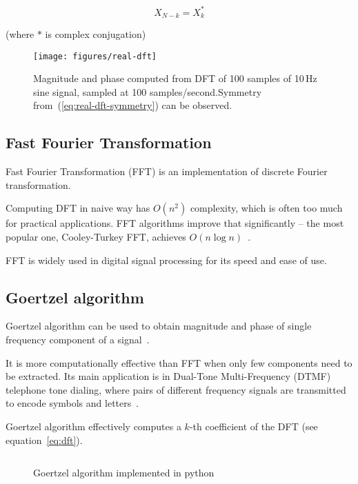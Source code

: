 \begin{equation}
\label{eq:real-dft-symmetry}
X_{N-k} = X_{k}^{*}
\end{equation}

(where $*$ is complex conjugation)

\begin{figure}[h]
  \centering
  \texttt{[image: figures/real-dft]}
  \caption[Magnitude and phase computed from DFT]{Magnitude and phase computed from DFT of 100 samples of 10\,Hz sine signal, sampled at 100 samples/second.\newline Symmetry from~(\ref{eq:real-dft-symmetry}) can be observed.}
  \label{fig:real-dft}
\end{figure}

\subsection{Fast Fourier Transformation}
\label{subsec:fft}

Fast Fourier Transformation (FFT) is an implementation of discrete Fourier transformation.

Computing DFT in naive way has $O(n^{2})$ complexity, which is often too much for practical applications.
FFT algorithms improve that significantly -- the most popular one, Cooley-Turkey FFT, achieves $O(n\log{n})$~\cite{JOSDFT}.

FFT is widely used in digital signal processing for its speed and ease of use.

\subsection{Goertzel algorithm}
\label{subsec:goertzel}

Goertzel algorithm can be used to obtain magnitude and phase of single frequency component of a signal~\cite{PS12}.

It is more computationally effective than FFT when only few components need to be extracted. Its main application is in
Dual-Tone Multi-Frequency (DTMF) telephone tone dialing, where pairs of different frequency signals are transmitted to encode symbols and letters~\cite{DTMF}.

Goertzel algorithm effectively computes a $k$-th coefficient of the DFT (see equation~\ref{eq:dft}).

\begin{figure}[h]
\centering
\inputminted[linenos]{python}{listings/goertzel.py}
\caption{Goertzel algorithm implemented in python}
\label{fig:goertzel-python}
\end{figure}

